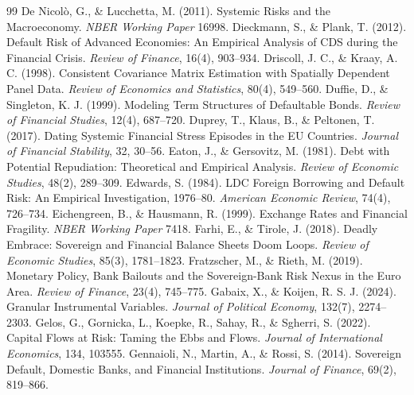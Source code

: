 \begin{thebibliography}{99}
 De Nicolò, G., \& Lucchetta, M. (2011). Systemic Risks and the Macroeconomy. \textit{NBER Working Paper} 16998.
 Dieckmann, S., \& Plank, T. (2012). Default Risk of Advanced Economies: An Empirical Analysis of CDS during the Financial Crisis. \textit{Review of Finance}, 16(4), 903--934.
 Driscoll, J. C., \& Kraay, A. C. (1998). Consistent Covariance Matrix Estimation with Spatially Dependent Panel Data. \textit{Review of Economics and Statistics}, 80(4), 549--560.
 Duffie, D., \& Singleton, K. J. (1999). Modeling Term Structures of Defaultable Bonds. \textit{Review of Financial Studies}, 12(4), 687--720.
 Duprey, T., Klaus, B., \& Peltonen, T. (2017). Dating Systemic Financial Stress Episodes in the EU Countries. \textit{Journal of Financial Stability}, 32, 30--56.
 Eaton, J., \& Gersovitz, M. (1981). Debt with Potential Repudiation: Theoretical and Empirical Analysis. \textit{Review of Economic Studies}, 48(2), 289--309.
 Edwards, S. (1984). LDC Foreign Borrowing and Default Risk: An Empirical Investigation, 1976--80. \textit{American Economic Review}, 74(4), 726--734.
 Eichengreen, B., \& Hausmann, R. (1999). Exchange Rates and Financial Fragility. \textit{NBER Working Paper} 7418.
 Farhi, E., \& Tirole, J. (2018). Deadly Embrace: Sovereign and Financial Balance Sheets Doom Loops. \textit{Review of Economic Studies}, 85(3), 1781--1823.
 Fratzscher, M., \& Rieth, M. (2019). Monetary Policy, Bank Bailouts and the Sovereign-Bank Risk Nexus in the Euro Area. \textit{Review of Finance}, 23(4), 745--775.
 Gabaix, X., \& Koijen, R. S. J. (2024). Granular Instrumental Variables. \textit{Journal of Political Economy}, 132(7), 2274--2303.
 Gelos, G., Gornicka, L., Koepke, R., Sahay, R., \& Sgherri, S. (2022). Capital Flows at Risk: Taming the Ebbs and Flows. \textit{Journal of International Economics}, 134, 103555.
 Gennaioli, N., Martin, A., \& Rossi, S. (2014). Sovereign Default, Domestic Banks, and Financial Institutions. \textit{Journal of Finance}, 69(2), 819--866.

\end{thebibliography}

